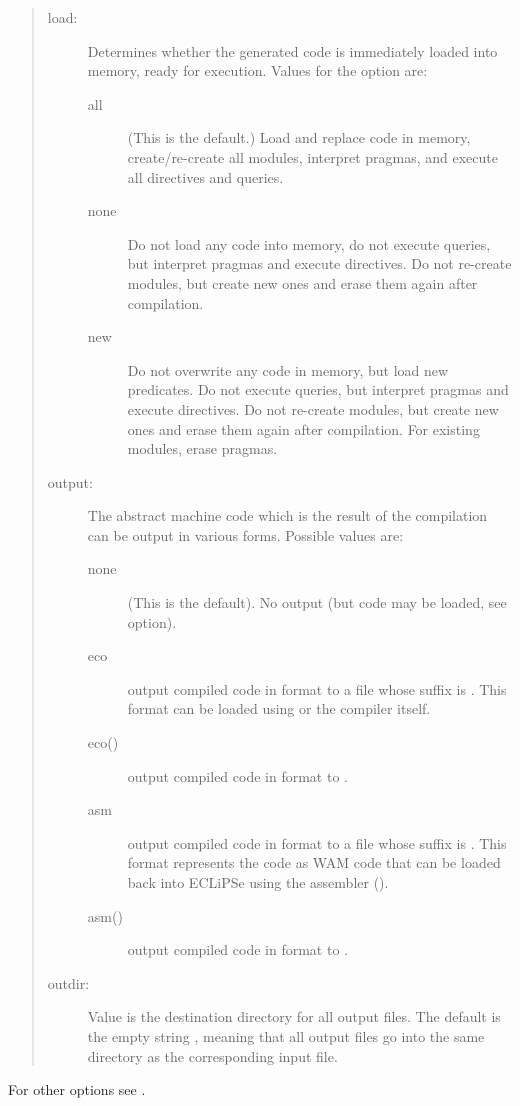 \begin{quote}
\begin{description}
\item[load:]
    Determines whether the generated code is immediately loaded into memory,
    ready for execution.  Values for the  option are:
    \begin{description}
    \item[all]
        (This is the default.) Load and replace code in memory, create/re-create
      all modules,
	interpret pragmas, and execute all directives and queries.
    \item[none]
        Do not load any code into memory, do not execute queries,
	but interpret pragmas and execute directives.
        Do not re-create modules, but create new ones and erase them
        again after compilation.
    \item[new]
        Do not overwrite any code in memory, but load new predicates.
        Do not execute queries, but interpret pragmas and execute directives.
        Do not re-create modules, but create new ones and erase them
        again after compilation. For existing modules, erase pragmas.
    \end{description}

\item[output:]
    The abstract machine code which is the result of the compilation can
    be output in various forms.  Possible values are:
    \begin{description}
    \item[none]
        (This is the default).
      No output (but code may be loaded, see  option).
    \item[eco]
        output compiled code in  format to a file whose suffix is
        .
        This format can be loaded using  or the
        compiler itself.
    \item[eco()]
        output compiled code in  format to .
    \item[asm]
        output compiled code in  format to a file whose suffix is
        .
        This format represents the code as WAM code that can be loaded back
        into ECLiPSe using the assembler ().
    \item[asm()]
        output compiled code in  format to .
    \end{description}

\item[outdir:]
    Value is the destination directory for all output files.
    The default is the empty string , meaning that all output files
    go into the same directory as the corresponding input file.
\end{description}
\end{quote}
For other options see
.

